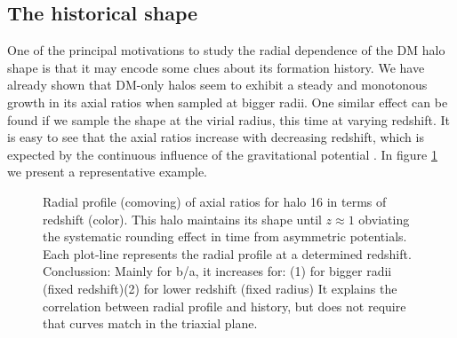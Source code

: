 \documentclass[a4paper,fleqn,usenatbib]{mnras}
\begin{document}
\subsection{The historical shape}
One of the principal motivations to study the radial dependence of the
DM halo shape is that it may encode some clues about its formation
history. We have already shown that DM-only halos seem to exhibit a
steady and monotonous growth in its axial ratios when sampled at
bigger radii. One similar effect can be found if we sample the shape
at the virial radius, this time at varying redshift. It is easy to see
that the axial ratios increase with decreasing redshift, which is
expected by the continuous influence of the gravitational potential
\cite{Vera-Ciro_et_al._2011}. In figure \ref{fig:RedshiftGood} we
present a representative example.
 
\begin{figure}
  \caption{Radial profile (comoving) of axial ratios for halo 16 in
    terms of redshift (color). This halo maintains its shape until
    $z\approx 1$ obviating the systematic rounding effect in time from
    asymmetric potentials. Each plot-line represents the radial
    profile at a determined redshift. Conclussion: Mainly for b/a, it increases for:
    (1) for bigger radii (fixed redshift)(2) for lower redshift (fixed
    radius) It explains the correlation between radial profile and
    history, but does not require that curves match in the triaxial
    plane.}
  \label{fig:RedshiftGood}
\end{figure}
\end{document}

